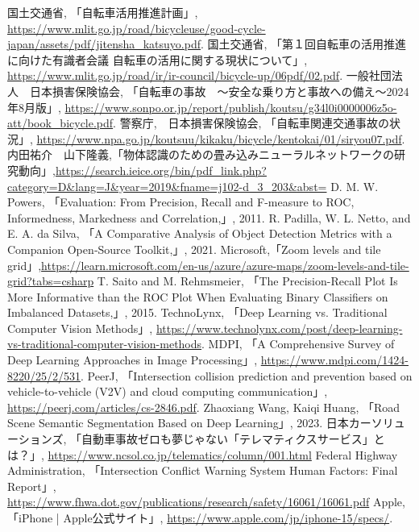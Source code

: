 \documentclass[uplatex,dvipdfmx]{jsarticle}
\begin{document}
\begin{thebibliography}{9}
 国土交通省, 「自転車活用推進計画」, \url{https://www.mlit.go.jp/road/bicycleuse/good-cycle-japan/assets/pdf/jitensha_katsuyo.pdf}.
  国土交通省, 「第１回自転車の活用推進に向けた有識者会議 自転車の活用に関する現状について」, \url{https://www.mlit.go.jp/road/ir/ir-council/bicycle-up/06pdf/02.pdf}.
 一般社団法人　日本損害保険協会, 「自転車の事故　〜安全な乗り方と事故への備え〜2024年8月版」, \url{https://www.sonpo.or.jp/report/publish/koutsu/g34l0i0000006z5o-att/book_bicycle.pdf}.
 警察庁,　日本損害保険協会, 「自転車関連交通事故の状況」, \url{https://www.npa.go.jp/koutsuu/kikaku/bicycle/kentokai/01/siryou07.pdf}.
 内田祐介　山下隆義,「物体認識のための畳み込みニューラルネットワークの研究動向」,\url{https://search.ieice.org/bin/pdf_link.php?category=D&lang=J&year=2019&fname=j102-d_3_203&abst=}
D. M. W. Powers, 「Evaluation: From Precision, Recall and F-measure to ROC, Informedness, Markedness and Correlation,」, 2011.
R. Padilla, W. L. Netto, and E. A. da Silva, 「A Comparative Analysis of Object Detection Metrics with a Companion Open‐Source Toolkit,」, 2021.
Microsoft,「Zoom levels and tile grid」,\url{https://learn.microsoft.com/en-us/azure/azure-maps/zoom-levels-and-tile-grid?tabs=csharp}
T. Saito and M. Rehmsmeier, 「The Precision-Recall Plot Is More Informative than the ROC Plot When Evaluating Binary Classifiers on Imbalanced Datasets,」, 2015.
 TechnoLynx, 「Deep Learning vs. Traditional Computer Vision Methods」, \url{https://www.technolynx.com/post/deep-learning-vs-traditional-computer-vision-methods}.
 MDPI, 「A Comprehensive Survey of Deep Learning Approaches in Image Processing」, \url{https://www.mdpi.com/1424-8220/25/2/531}.
 PeerJ, 「Intersection collision prediction and prevention based on vehicle-to-vehicle (V2V) and cloud computing communication」, \url{https://peerj.com/articles/cs-2846.pdf}.
Zhaoxiang Wang, Kaiqi Huang, 「Road Scene Semantic Segmentation Based on Deep Learning」, 2023.
 日本カーソリューションズ, 「自動車事故ゼロも夢じゃない「テレマティクスサービス」とは？」, 
\url{https://www.ncsol.co.jp/telematics/column/001.html}
 Federal Highway Administration, 「Intersection Conflict Warning System Human Factors: Final Report」, 
\url{https://www.fhwa.dot.gov/publications/research/safety/16061/16061.pdf}
Apple, 「iPhone | Apple公式サイト」, \url{https://www.apple.com/jp/iphone-15/specs/}.


\end{thebibliography}
\end{document}
